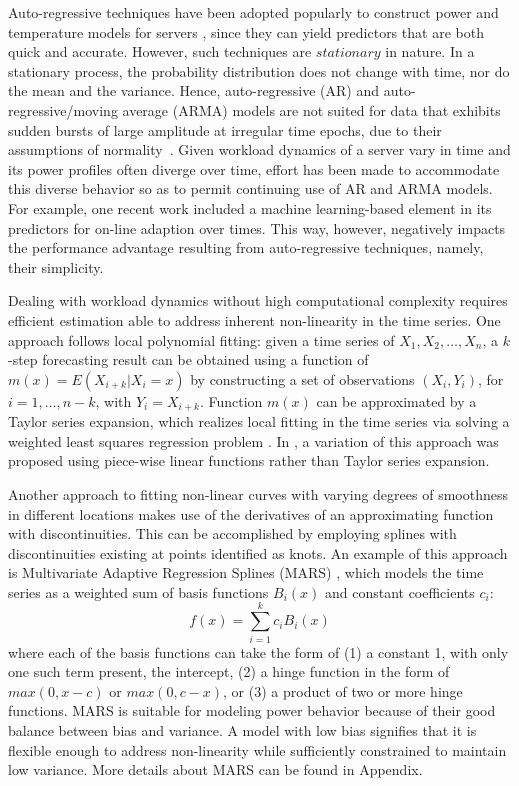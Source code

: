 Auto-regressive techniques have been adopted popularly to construct
power and temperature models for servers \cite{Coskun2008}, since they
can yield predictors that are both quick and accurate.  However, such
techniques are $stationary$ in nature.  In a stationary process, the
probability distribution does not change with time, nor do the mean and
the variance.  Hence, auto-regressive (AR) and auto-regressive/moving
average (ARMA) models are not suited for data that exhibits sudden
bursts of large amplitude at irregular time epochs, due to their
assumptions of normality~\cite{Tong1993}.  Given workload dynamics of a
server vary in time and its power profiles often diverge over time,
effort has been made to accommodate this diverse behavior so as to
permit continuing use of AR and ARMA models.  For example, one recent
work \cite{Coskun2008} included a machine learning-based element in its
predictors for on-line adaption over times.  This way, however,
negatively impacts the performance advantage resulting from
auto-regressive techniques, namely, their simplicity.

Dealing with workload dynamics without high computational complexity requires
efficient estimation able to address inherent non-linearity in the time series.
One approach follows local polynomial fitting: given a time series of
$X_{1}, X_{2},\ldots,X_{n}$, a $k$-step forecasting result can be
obtained using a function of $m(x)=E(X_{i+k}|X_{i}=x)$ by constructing
a set of observations $(X_{i},Y_{i})$, for $i=1,\ldots,n-k$, with $Y_{i}=X_{i+k}$.
Function $m(x)$ can be approximated by a Taylor series expansion,
which realizes local fitting in the time series via solving
a weighted least squares regression problem \cite{Fan1996}.  In
\cite{Singh2009}, a variation of this approach was proposed using
piece-wise linear functions rather than Taylor series expansion.

Another approach to fitting non-linear curves with varying
degrees of smoothness in different locations makes use of the
derivatives of an approximating function with discontinuities.
This can be accomplished by employing splines with discontinuities
existing at points identified as knots.
An example of this approach is Multivariate Adaptive Regression Splines (MARS)
\cite{Friedman1991}, which models the time series as a weighted sum of
basis functions $B_{i}(x)$ and constant coefficients $c_{i}$:
\begin{equation}
  \label{eq:mars}
  f(x)= \displaystyle\sum_{i=1}^{k}c_{i}B_{i}(x)
\end{equation}
where each of the basis functions can take the form of (1) a constant 1,
with only one such term present, the intercept, (2) a hinge function in
the form of $max(0,x - c)$ or $max(0, c - x)$, or (3) a product of two or
more hinge functions.   MARS is suitable for modeling power
behavior because of their good balance between bias and variance.
A model with low bias signifies that it is flexible enough to address
non-linearity while sufficiently constrained to maintain low variance.
More details about MARS can be found in Appendix.

